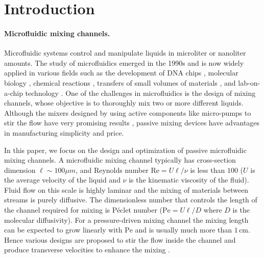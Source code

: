 %
%
\section{Introduction}
\label{sec:topoptintro}




\paragraph{Microfluidic mixing channels.}
Microfluidic systems control and manipulate liquids in microliter or nanoliter amounts. The study of microfluidics emerged in the 1990s and
is now widely applied in various fields such as the development of DNA chips \cite{Burns1998}, molecular biology \cite{DavidJ2002},
chemical reactions \cite{Andersson2000}, transfers of small volumes of materials \cite{Sammarco1999}, and lab-on-a-chip technology
\cite{weigl2003,Stone2004}. One of the challenges in microfluidics is the design of mixing channels, whose objective is to thoroughly mix
two or more different liquids. Although the mixers designed by using active components like micro-pumps to stir the flow have very
promising results \cite{Yang2000,Deshmukh2000}, passive mixing devices have advantages in manufacturing simplicity and price.

In this paper, we focus on the design and optimization of passive microfluidic mixing channels. A microfluidic mixing channel typically has
cross-section dimension $\ell\sim 100\mu m$, and Reynolds number $\text{Re}=U\ell/\nu$ is less than $100$ \cite{Stroock2002} ($U$ is the average
velocity of the liquid and $\nu$ is the kinematic viscosity of the fluid).  Fluid flow on this scale is highly laminar and the mixing of
materials between streams is purely diffusive. The dimensionless number that controls the length of the channel required for mixing is
P\'{e}clet number ($\text{Pe}= U\ell/D$ where $D$ is the molecular diffusivity). For a pressure-driven mixing channel the mixing length can be
expected to grow linearly with $\text{Pe}$ and is usually much more than $1\,\text{cm}$. Hence various designs are proposed to stir the
flow inside the channel and produce transverse velocities to enhance the mixing \cite{Stroock2002, Ottino2004Science, Wiggins2004}.

